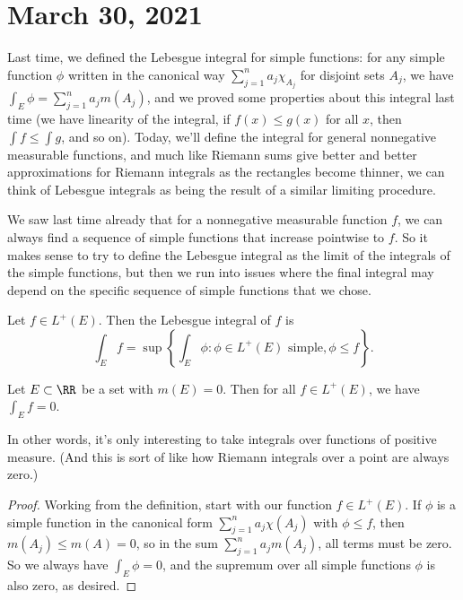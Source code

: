 
\pagebreak\section*{March 30, 2021}

Last time, we defined the Lebesgue integral for simple functions: for any simple function $\phi$ written in the canonical way $\sum_{j=1}^n a_j \chi_{A_j}$ for disjoint sets $A_j$, we have $\int_E \phi = \sum_{j=1}^n a_j m(A_j)$, and we proved some properties about this integral last time (we have linearity of the integral, if $f(x) \le g(x)$ for all $x$, then $\int f \le \int g$, and so on). Today, we'll define the integral for general nonnegative measurable functions, and much like Riemann sums give better and better approximations for Riemann integrals as the rectangles become thinner, we can think of Lebesgue integrals as being the result of a similar limiting procedure.

We saw last time already that for a nonnegative measurable function $f$, we can always find a sequence of simple functions that increase pointwise to $f$. So it makes sense to try to define the Lebesgue integral as the limit of the integrals of the simple functions, but then we run into issues where the final integral may depend on the specific sequence of simple functions that we chose.

\begin{definition}
Let $f \in L^+(E)$. Then the Lebesgue integral of $f$ is
\[
    \int_E f = \sup\left\{\int_E \phi: \phi \in L^+(E) \text{ simple}, \phi \le f\right\}.
\]
\end{definition}

\begin{proposition}\label{lebesgdefn1}
Let $E \subset \RR$ be a set with $m(E) = 0$. Then for all $f \in L^+(E)$, we have $\int_E f = 0$.
\end{proposition}

In other words, it's only interesting to take integrals over functions of positive measure. (And this is sort of like how Riemann integrals over a point are always zero.)

\begin{proof}
Working from the definition, start with our function $f \in L^+(E)$. If $\phi$ is a simple function in the canonical form $\sum_{j=1}^n a_j \chi(A_j)$ with $\phi \le f$, then $m(A_j) \le m(A) = 0$, so in the sum $\sum_{j=1}^n a_j m(A_j)$, all terms must be zero. So we always have $\int_E \phi = 0$, and the supremum over all simple functions $\phi$ is also zero, as desired.
\end{proof}

